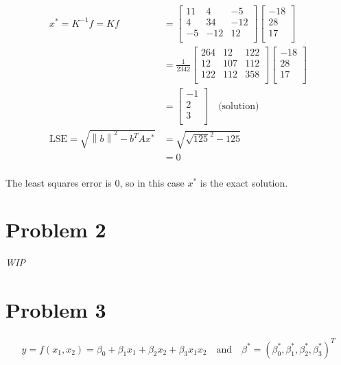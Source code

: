 \documentclass[10pt,letter]{article}
\newcommand\norm[1]{\left\lVert#1\right\rVert}
\begin{document}
\begin{align*}
x^* = K^{-1} f = K f &=
\left[ {\begin{array}{ccc}
 11 & 4  & -5 \\
 4 & 34  & -12 \\
 -5 & -12  & 12 \\
\end{array} } \right]
\left[ {\begin{array}{c}
 -18 \\
 28 \\
 17 \\
\end{array} } \right]
\\ &= \frac{1}{2342}
\left[ {\begin{array}{ccc}
 264 & 12 & 122 \\
 12 & 107 & 112 \\
 122 & 112  & 358 \\
\end{array} } \right]
\left[ {\begin{array}{c}
 -18 \\
 28 \\
 17 \\
\end{array} } \right]
\\ &=
\left[ {\begin{array}{c}
 -1 \\
 2 \\
 3 \\
\end{array} } \right]
\quad \textrm{(solution)}
\\ \textrm{LSE} = \sqrt{\norm{b}^2 - b^T A x^*} &= \sqrt{\sqrt{125}^2 - 125}
\\ &= 0\\
\end{align*}

The least squares error is $0$, so in this case $x^*$ is the exact solution.

\section*{Problem 2}

\textit{WIP}

\section*{Problem 3}
\begin{gather*}
y = f(x_1, x_2) = \beta_0 + \beta_1 x_1 + \beta_2 x_2 + \beta_3 x_1 x_2
\quad \textrm{and} \quad
\beta^* = (\beta^*_0, \beta^*_1, \beta^*_2, \beta^*_3)^T
\end{gather*}
\end{document}
